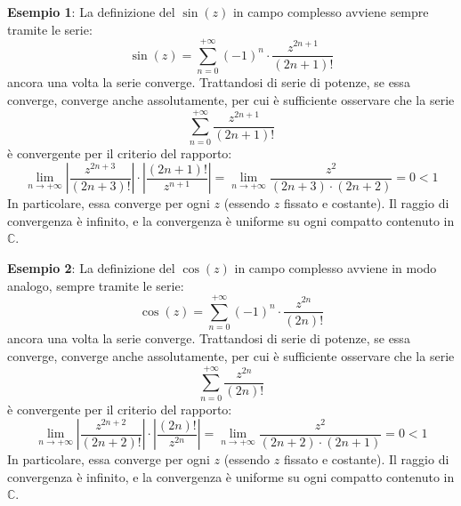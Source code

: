 \documentclass[a4paper]{extarticle}
\begin{document}
\vspace{1em}
\noindent
\textbf{Esempio 1}: La definizione del $\sin(z)$ in campo complesso avviene sempre tramite le serie:
\[\sin(z) = \sum_{n=0}^{+\infty} (-1)^n \cdot \frac{z^{2n+1}}{(2n+1)!}\]
ancora una volta la serie converge. Trattandosi di serie di potenze, se essa converge, converge anche assolutamente, per cui è sufficiente osservare che la serie
\[\sum_{n=0}^{+\infty} \frac{z^{2n+1}}{(2n+1)!}\]
è convergente per il criterio del rapporto:
\[\lim_{n \to + \infty} \left \vert \dfrac{z^{2n+3}}{(2n+3)!} \right \vert \cdot \left \vert \dfrac{(2n+1)!}{z^{n+1}} \right \vert = \lim_{n \to + \infty}\frac{z^2}{(2n+3) \cdot (2n+2)} = 0 < 1\]
In particolare, essa converge per ogni $z$ (essendo $z$ fissato e costante). Il raggio di convergenza è infinito, e la convergenza è uniforme su ogni compatto contenuto in $\mathbb{C}$.

\vspace{1em}
\noindent
\textbf{Esempio 2}: La definizione del $\cos(z)$ in campo complesso avviene in modo analogo, sempre tramite le serie:
\[\cos(z) = \sum_{n=0}^{+\infty} (-1)^n \cdot \frac{z^{2n}}{(2n)!}\]
ancora una volta la serie converge. Trattandosi di serie di potenze, se essa converge, converge anche assolutamente, per cui è sufficiente osservare che la serie
\[\sum_{n=0}^{+\infty} \frac{z^{2n}}{(2n)!}\]
è convergente per il criterio del rapporto:
\[\lim_{n \to + \infty} \left \vert \dfrac{z^{2n+2}}{(2n+2)!} \right \vert \cdot \left \vert \dfrac{(2n)!}{z^{2n}} \right \vert = \lim_{n \to + \infty}\frac{z^2}{(2n+2) \cdot (2n+1)} = 0 < 1\]
In particolare, essa converge per ogni $z$ (essendo $z$ fissato e costante). Il raggio di convergenza è infinito, e la convergenza è uniforme su ogni compatto contenuto in $\mathbb{C}$.
\end{document}
